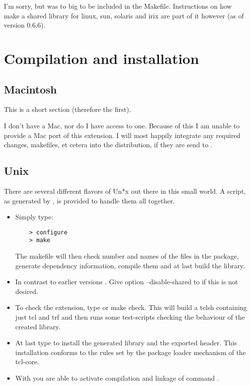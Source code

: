 \documentclass {report}
\begin{document}
I'm sorry, but \SSLeay{} was to big to be included in the
Makefile. Instructions on how make a shared library for linux, sun,
solaris and irix are part of it however (as of version 0.6.6).



\chapter {Compilation and installation}
\section {Macintosh}

	This is a short section (therefore the first).

	I don't have a Mac, nor do I have access to one. Because
	of this I am unable to provide a Mac port of this
	extension.  I will most happily integrate any required
	changes, makefiles, et cetera into the distribution,
	if they are send to \me{}.


\section {Unix}

There are several different flavors of Un*x out there in this small
world. A  script, as generated by , is provided to handle them all together.

\begin {itemize}
\item	Simply type:

\begin{verbatim}
	> configure
	> make
\end{verbatim}

The makefile will then check number and names of the files in the
package, generate dependency information, compile them and at last
build the library.

\item	In contrast to earlier versions . Give option \opt
	{--disable-shared} to  if this is not
	desired.

\item	To check the extension, type  or \cmd
	{make check}. This will build a tclsh containing just tcl and
	trf and then runs some test-scripts checking the behaviour of
	the created library. 

\item	At last type  to install the generated
	library and the exported header. This installation conforms to
	the rules set by the package loader mechanism of the tcl-core. 

\item	With  you are able to activate compilation
	and linkage of command .
\end {itemize}
\end{document}
